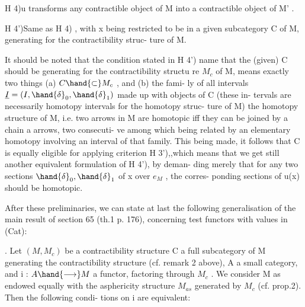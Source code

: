 
H 4)\quad u transforms any contractible object of M into a contractible
object of M' .

H 4')\quad Same as H 4) , with x being restricted to be in a given 
subcategory C of M, generating for the contractibility struc-%
ture of M.

\hand{\uline{\textcolor{black}{Remark}}} It should be noted that the condition stated\deleted{,} in H 4')  name
that the (given) C should be generating for the contractibility structu%
re $M_c$ of M, means exactly two things (a) $C \hand{\subset} M_c$ , and (b) the fami-%
ly of all intervals $\underline{I} = (I,\hand{\delta}_0,\hand{\delta}_1)$ made up with objects of C (these in-%
tervals are necessarily homotopy intervals for the homotopy struc-%
ture of M) \hand{\uline{\textcolor{black}{generates}}} the homotopy structure of M, i.e. two arrows in M
are homotopic iff they can be joined by a chain a arrows, two consecuti-%
ve among which being related by an elementary homotopy involving an
interval of that family. This  being made, it follows that C
 is equally eligible for applying criterion H 3'),,which means that
 we get still another equivalent formulation of H 4'), by deman-%
ding merely that for any two sections $\hand{\delta}_0,\hand{\delta}_1$ of x over $e_M$ , the corres-%
ponding sections of u(x) should be homotopic.

After these preliminaries, we can state at last 
the following generalisation of the main result of section 65 (th.1
p. 176), concerning test functors with values in (Cat):

\hand{\uline{\textcolor{black}{Theorem 1}}} . Let $(M,M_c)$ be a contractibility structure\deleted{,}\hand{,} C a \hand{\uwave{\textcolor{black}{small}}} full
subcategory of M generating the contractibility structure (cf. remark 2
above), A a small category, and i : $A \hand{\longrightarrow} M$ a functor, factoring
through $M_c$ . We consider M as endowed equally with the asphericity
structure $M_{as}$ generated by $M_c$ (cf. prop.2). Then the following condi-%
tions on i are equivalent:

